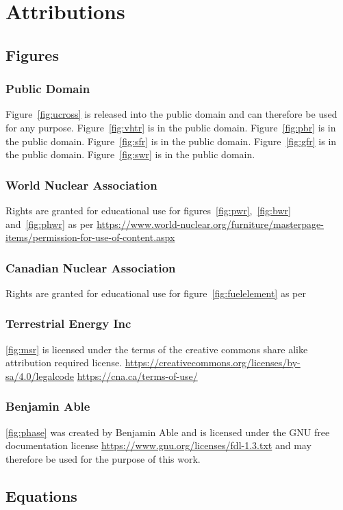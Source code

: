 \chapter{Attributions}
\section{Figures}
\subsection{Public Domain}
Figure~\ref{fig:ucross} is released into the public domain and can therefore be used for any purpose.
Figure~\ref{fig:vhtr} is in the public domain.
Figure~\ref{fig:pbr} is in the public domain.
Figure~\ref{fig:sfr} is in the public domain.
Figure~\ref{fig:gfr} is in the public domain.
Figure~\ref{fig:swr} is in the public domain.
\subsection{World Nuclear Association}
Rights are granted for educational use for figures~\ref{fig:pwr},~\ref{fig:bwr} and~\ref{fig:phwr}
as per \href{https://www.world-nuclear.org/furniture/masterpage-items/permission-for-use-of-content.aspx}{https://www.world-nuclear.org/furniture/masterpage-items/permission-for-use-of-content.aspx}
\subsection{Canadian Nuclear Association}
Rights are granted for educational use for figure~\ref{fig:fuelelement} as per
\subsection{Terrestrial Energy Inc}
\ref{fig:msr} is licensed under the terms of the creative commons share alike attribution required
license. \url{https://creativecommons.org/licenses/by-sa/4.0/legalcode}
\url{https://cna.ca/terms-of-use/}
\subsection{Benjamin Able}
\ref{fig:phase} was created by Benjamin Able and is licensed under the GNU free documentation license
\url{https://www.gnu.org/licenses/fdl-1.3.txt} and may therefore be used for the purpose of this
work.
\section{Equations}
